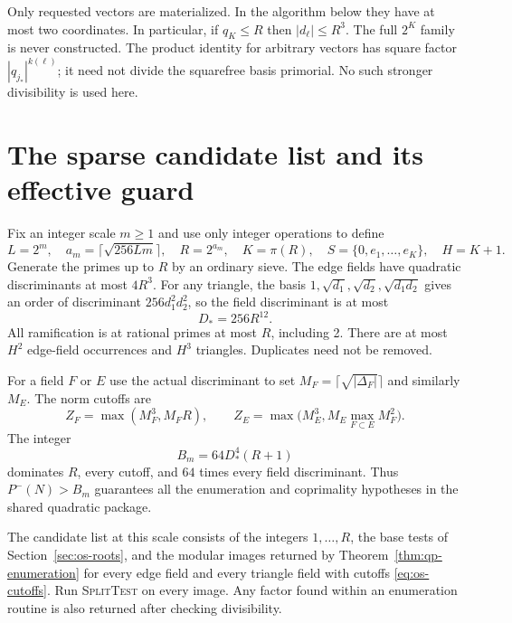 Only requested vectors are materialized.  In the algorithm below they
have at most two coordinates.  In particular, if $q_K\leq R$ then
$|d_\ell|\leq R^3$.  The full $2^K$ family is never constructed.
The product identity for arbitrary vectors has square factor
$|q_{j_*}|^{k(\ell)}$; it need not divide the squarefree basis primorial.
No such stronger divisibility is used here.

\section{The sparse candidate list and its effective guard}
\label{sec:os-scale}

Fix an integer scale $m\geq1$ and use only integer operations to define
\begin{equation}
 L=2^m,\quad a_m=\lceil\sqrt{256Lm}\rceil,\quad
 R=2^{a_m},\quad K=\pi(R),\quad
 S=\{0,e_1,\ldots,e_K\},\quad H=K+1.
 \label{eq:os-scale}
\end{equation}
Generate the primes up to $R$ by an ordinary sieve.
The edge fields have quadratic discriminants at most $4R^3$.
For any triangle, the basis
$1,\sqrt{d_1},\sqrt{d_2},\sqrt{d_1d_2}$ gives an order of
discriminant $256d_1^2d_2^2$, so the field discriminant is at most
\begin{equation}
 D_*=256R^{12}.
 \label{eq:os-Dstar}
\end{equation}
All ramification is at rational primes at most $R$, including 2.
There are at most $H^2$ edge-field occurrences and $H^3$ triangles.
Duplicates need not be removed.

For a field $F$ or $E$ use the actual discriminant to set
$M_F=\lceil\sqrt{|\Delta_F|}\rceil$ and similarly $M_E$.
The norm cutoffs are
\begin{equation}
 Z_F=\max(M_F^3,M_FR),\qquad
 Z_E=\max\bigl(M_E^3,M_E\max_{F\subset E}M_F^2\bigr).
 \label{eq:os-cutoffs}
\end{equation}
The integer
\begin{equation}
 B_m=64D_*^4(R+1)
 \label{eq:os-guard}
\end{equation}
dominates $R$, every cutoff, and $64$ times every field discriminant.
Thus $P^-(N)>B_m$ guarantees all the enumeration and coprimality
hypotheses in the shared quadratic package.

The candidate list at this scale consists of the integers $1,\ldots,R$,
the base tests of Section~\ref{sec:os-roots}, and the modular images
returned by Theorem~\ref{thm:qp-enumeration} for every edge field and
every triangle field with cutoffs \eqref{eq:os-cutoffs}.
Run \textsc{SplitTest} on every image.  Any factor found within an
enumeration routine is also returned after checking divisibility.

